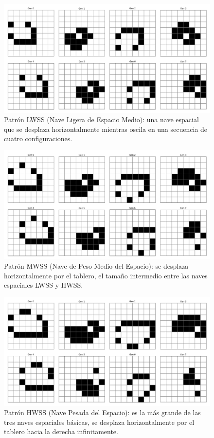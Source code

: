 \documentclass[]{article}
\begin{document}
\begin{figure}[H]
  \centering
  \includegraphics[width=1\textwidth]{../assets/space_ships/LWSS/LWSS.jpg}
  \caption{Patrón LWSS (Nave Ligera de Espacio Medio): una nave espacial que se desplaza horizontalmente mientras oscila en una secuencia de cuatro configuraciones.}
  \label{fig:LWS}
\end{figure}

\begin{figure}[H]
  \centering
  \includegraphics[width=1\textwidth]{../assets/space_ships/MWSS/MWSS.png}
  \caption{Patrón MWSS (Nave de Peso Medio del Espacio): se desplaza horizontalmente por el tablero, el tamaño intermedio entre las naves espaciales LWSS y HWSS.}
  \label{fig:MWSS}
\end{figure}

\begin{figure}[H]
  \centering
  \includegraphics[width=1\textwidth]{../assets/space_ships/HWSS/HWSS.png}
  \caption{Patrón HWSS (Nave Pesada del Espacio): es la más grande de las tres naves espaciales básicas, se desplaza horizontalmente por el tablero hacia la derecha infinitamente.}
  \label{fig:HWS}
\end{figure}
\end{document}
